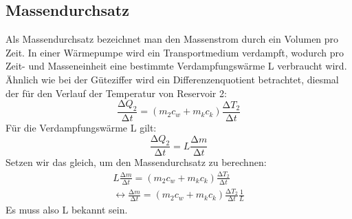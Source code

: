 \subsection{Massendurchsatz}
Als Massendurchsatz bezeichnet man den Massenstrom durch ein Volumen pro Zeit. In einer Wärmepumpe wird ein Transportmedium verdampft, wodurch pro Zeit- und
Masseneinheit eine bestimmte Verdampfungswärme L verbraucht wird. \\
Ähnlich wie bei der Güteziffer wird ein Differenzenquotient betrachtet, diesmal der für den Verlauf der Temperatur von Reservoir 2:
\begin{equation}
\frac{\increment Q_2}{\increment t} = \left( m_2 c_w + m_k c_k \right) \frac{\increment T_2}{\increment t}
\end{equation}
Für die Verdampfungswärme L gilt:
\begin{equation}
\label{eq:neun}
\frac{\increment Q_2}{\increment t} = L \frac{\increment m}{\increment t}
\end{equation}
Setzen wir das gleich, um den Massendurchsatz zu berechnen:
\begin{align}
L \frac{\increment m}{\increment t} = \left( m_2 c_w + m_k c_k \right) \frac{\increment T_2}{\increment t}\\
\leftrightarrow \frac{\increment m}{\increment t} = \left( m_2 c_w + m_k c_k \right) \frac{\increment T_2}{\increment t} \frac{1}{L}
\end{align}
Es muss also L bekannt sein.

